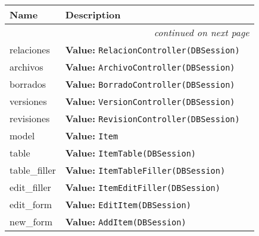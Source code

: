     \vspace{-1cm}
\hspace{\varindent}\begin{longtable}{|p{\varnamewidth}|p{\vardescrwidth}|l}
\cline{1-2}
\cline{1-2} \centering \textbf{Name} & \centering \textbf{Description}& \\
\cline{1-2}
\endhead\cline{1-2}\multicolumn{3}{r}{\small\textit{continued on next page}}\\\endfoot\cline{1-2}
\endlastfoot\raggedright r\-e\-l\-a\-c\-i\-o\-n\-e\-s\- & \raggedright \textbf{Value:} 
{\tt RelacionController(DBSession)}&\\
\cline{1-2}
\raggedright a\-r\-c\-h\-i\-v\-o\-s\- & \raggedright \textbf{Value:} 
{\tt ArchivoController(DBSession)}&\\
\cline{1-2}
\raggedright b\-o\-r\-r\-a\-d\-o\-s\- & \raggedright \textbf{Value:} 
{\tt BorradoController(DBSession)}&\\
\cline{1-2}
\raggedright v\-e\-r\-s\-i\-o\-n\-e\-s\- & \raggedright \textbf{Value:} 
{\tt VersionController(DBSession)}&\\
\cline{1-2}
\raggedright r\-e\-v\-i\-s\-i\-o\-n\-e\-s\- & \raggedright \textbf{Value:} 
{\tt RevisionController(DBSession)}&\\
\cline{1-2}
\raggedright m\-o\-d\-e\-l\- & \raggedright \textbf{Value:} 
{\tt Item}&\\
\cline{1-2}
\raggedright t\-a\-b\-l\-e\- & \raggedright \textbf{Value:} 
{\tt ItemTable(DBSession)}&\\
\cline{1-2}
\raggedright t\-a\-b\-l\-e\-\_\-f\-i\-l\-l\-e\-r\- & \raggedright \textbf{Value:} 
{\tt ItemTableFiller(DBSession)}&\\
\cline{1-2}
\raggedright e\-d\-i\-t\-\_\-f\-i\-l\-l\-e\-r\- & \raggedright \textbf{Value:} 
{\tt ItemEditFiller(DBSession)}&\\
\cline{1-2}
\raggedright e\-d\-i\-t\-\_\-f\-o\-r\-m\- & \raggedright \textbf{Value:} 
{\tt EditItem(DBSession)}&\\
\cline{1-2}
\raggedright n\-e\-w\-\_\-f\-o\-r\-m\- & \raggedright \textbf{Value:} 
{\tt AddItem(DBSession)}&\\
\cline{1-2}
\end{longtable}

